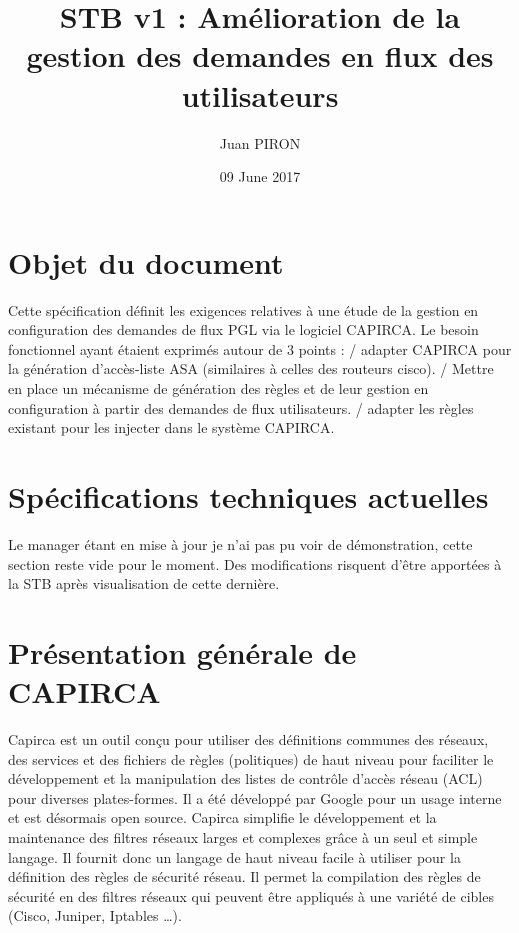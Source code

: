 \documentclass{article}
\title{STB v1 : Amélioration de la gestion des demandes en flux des utilisateurs}
\author{Juan PIRON}
\date{09 June 2017}
\begin{document}
\maketitle
\section{Objet du document}

Cette spécification définit les exigences relatives à une étude de la gestion en configuration des demandes de flux PGL via le logiciel CAPIRCA. Le besoin fonctionnel ayant étaient exprimés autour de 3 points :
/ adapter CAPIRCA pour la génération d’accès-liste ASA (similaires à celles des routeurs cisco).
/ Mettre en place un mécanisme de génération des règles et de leur gestion en configuration à partir des demandes de flux utilisateurs. 
/ adapter les règles existant pour les injecter dans le système CAPIRCA.

\maketitle
\section{Spécifications techniques actuelles}

{\color{red} Le manager étant en mise à jour je n'ai pas pu voir de démonstration, cette section reste vide pour le moment. Des modifications risquent d'être apportées à la STB après visualisation de cette dernière.}

\maketitle
\section{Présentation générale de CAPIRCA}

Capirca est un outil conçu pour utiliser des définitions communes des réseaux, des services et des fichiers de règles (politiques) de haut niveau pour faciliter le développement et la manipulation des listes de contrôle d'accès réseau (ACL) pour diverses plates-formes. Il a été développé par Google pour un usage interne et est désormais open source.
Capirca simplifie le développement et la maintenance des filtres réseaux larges et complexes grâce à un seul et simple langage. Il fournit donc un langage de haut niveau facile à utiliser pour la définition des règles de sécurité réseau. Il permet la compilation des règles de sécurité en des filtres réseaux qui peuvent être appliqués à une variété de cibles (Cisco, Juniper, Iptables …).
\end{document}
